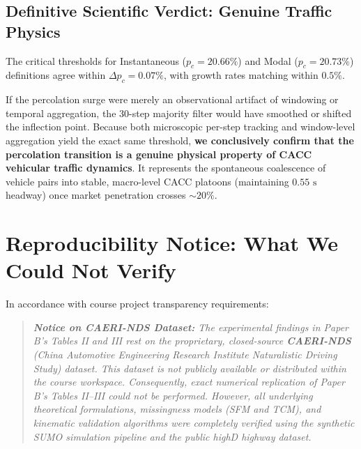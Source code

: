 \documentclass[11pt,a4paper]{article}
\begin{document}
\subsection{Definitive Scientific Verdict: Genuine Traffic Physics}
The critical thresholds for Instantaneous ($p_c = 20.66\%$) and Modal ($p_c = 20.73\%$) definitions agree within \textbf{$\Delta p_c = 0.07\%$}, with growth rates matching within $0.5\%$. 

If the percolation surge were merely an observational artifact of windowing or temporal aggregation, the 30-step majority filter would have smoothed or shifted the inflection point. Because both microscopic per-step tracking and window-level aggregation yield the exact same threshold, \textbf{we conclusively confirm that the percolation transition is a genuine physical property of CACC vehicular traffic dynamics}. It represents the spontaneous coalescence of vehicle pairs into stable, macro-level CACC platoons (maintaining $0.55\text{ s}$ headway) once market penetration crosses $\sim 20\%$.

\vspace{0.8em}

\section{Reproducibility Notice: What We Could Not Verify}
In accordance with course project transparency requirements:
\begin{quote}
    \textit{\textbf{Notice on CAERI-NDS Dataset:} The experimental findings in Paper B's Tables II and III rest on the proprietary, closed-source \textbf{CAERI-NDS} (China Automotive Engineering Research Institute Naturalistic Driving Study) dataset. This dataset is not publicly available or distributed within the course workspace. Consequently, exact numerical replication of Paper B's Tables II--III could not be performed. However, all underlying theoretical formulations, missingness models (SFM and TCM), and kinematic validation algorithms were completely verified using the synthetic SUMO simulation pipeline and the public highD highway dataset.}
\end{quote}

\vspace{0.8em}

\end{document}
